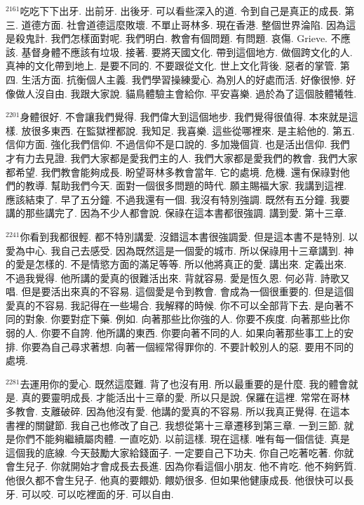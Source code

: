 \documentclass{book}
\begin{document}
$^{2161}$吃吃下下出牙.
出前牙.
出後牙.
可以看些深入的道.
令到自己是真正的成長.
第三.
道德方面.
社會道德這麼敗壞.
不單止哥林多.
現在香港.
整個世界淪陷.
因為這是殺鬼計.
我們怎樣面對呢.
我們明白.
教會有個問題.
有問題.
哀傷.
Grieve.
不應該.
基督身體不應該有垃圾.
接著.
要將天國文化.
帶到這個地方.
做個跨文化的人.
真神的文化帶到地上.
是要不同的.
不要跟從文化.
世上文化背後.
惡者的掌管.
第四.
生活方面.
抗衡個人主義.
我們學習操練愛心.
為別人的好處而活.
好像很慘.
好像做人沒自由.
我跟大家說.
貓鳥體驗主會給你.
平安喜樂.
過於為了這個肢體犧牲.

$^{2201}$身體很好.
不會讓我們覺得.
我們偉大到這個地步.
我們覺得很值得.
本來就是這樣.
放很多東西.
在監獄裡都說.
我知足.
我喜樂.
這些從哪裡來.
是主給他的.
第五.
信仰方面.
強化我們信仰.
不過信仰不是口說的.
多加幾個貨.
也是活出信仰.
我們才有力去見證.
我們大家都是愛我們主的人.
我們大家都是愛我們的教會.
我們大家都希望.
我們教會能夠成長.
盼望哥林多教會當年.
它的處境.
危機.
還有保祿對他們的教導.
幫助我們今天.
面對一個很多問題的時代.
願主賜福大家.
我講到這裡.
應該結束了.
早了五分鐘.
不過我還有一個.
我沒有特別強調.
既然有五分鐘.
我要講的那些講完了.
因為不少人都會說.
保祿在這本書都很強調.
講到愛.
第十三章.

$^{2241}$你看到我都很輕.
都不特別講愛.
沒錯這本書很強調愛.
但是這本書不是特別.
以愛為中心.
我自己去感受.
因為既然這是一個愛的城市.
所以保祿用十三章講到.
神的愛是怎樣的.
不是情慾方面的滿足等等.
所以他將真正的愛.
講出來.
定義出來.
不過我覺得.
他所講的愛真的很難活出來.
背就容易.
愛是恆久恩.
何必背.
詩歌又唱.
但是要活出來真的不容易.
這個愛是令到教會.
會成為一個很重要的.
但是這個愛真的不容易.
我記得在一些場合.
我解釋的時候.
你不可以全部背下去.
是向著不同的對象.
你要對症下藥.
例如.
向著那些比你強的人.
你要不疾度.
向著那些比你弱的人.
你要不自誇.
他所講的東西.
你要向著不同的人.
如果向著那些事工上的安排.
你要為自己尋求著想.
向著一個經常得罪你的.
不要計較別人的惡.
要用不同的處境.

$^{2281}$去運用你的愛心.
既然這麼難.
背了也沒有用.
所以最重要的是什麼.
我的體會就是.
真的要靈明成長.
才能活出十三章的愛.
所以只是說.
保羅在這裡.
常常在哥林多教會.
支離破碎.
因為他沒有愛.
他講的愛真的不容易.
所以我真正覺得.
在這本書裡的關鍵節.
我自己也修改了自己.
我想從第十三章遷移到第三章.
一到三節.
就是你們不能夠繼續屬肉體.
一直吃奶.
以前這樣.
現在這樣.
唯有每一個信徒.
真是這個我的底線.
今天鼓勵大家給錢面子.
一定要自己下功夫.
你自己吃著吃著.
你就會生兒子.
你就開始才會成長去長進.
因為你看這個小朋友.
他不肯吃.
他不夠鈣質.
他很久都不會生兒子.
他真的要餵奶.
餵奶很多.
但如果他健康成長.
他很快可以長牙.
可以咬.
可以吃裡面的牙.
可以自由.
\end{document}
